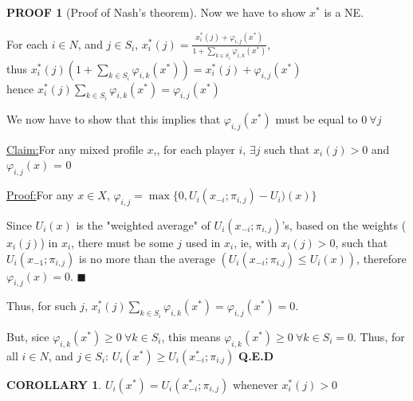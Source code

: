 \documentclass[12pt]{article}
\theoremstyle{definition}
\newtheorem*{Proof}{PROOF}
\newtheorem*{corollary}{COROLLARY}
\newenvironment{claim}[1]{\par\noindent\underline{Claim:}\space#1}{}
\newenvironment{claimproof}[1]{\par\noindent\underline{Proof:}\space#1}{\hfill $\blacksquare$}
\begin{document}
\begin{Proof}[Proof of Nash's theorem]
        Now we have to show $x^*$ is a NE.

        For each $i \in N$, and $j \in S_i$, $\displaystyle x_i^*(j) = \frac{x_i^*(j) + \varphi_{i,j}(x^*)}{1 + \sum_{k \in S_i} \varphi_{i,k}(x^*)}$,
        \\thus $x_i^*(j)\left(1 + \sum_{k \in S_i} \varphi_{i,k}(x^*)\right) = x_i^*(j) + \varphi_{i,j}(x^*)$
        \\hence $x_i^*(j)\sum_{k \in S_i} \varphi_{i,k}(x^*) = \varphi_{i,j}(x^*)$

        We now have to show that this implies that $\varphi_{i,j}(x^*)$ must be equal to  $0\ \forall j$

        \begin{claim}
            For any mixed profile $x$,, for each player $i$, $\exists j$ such that $x_i(j) > 0$ and $\varphi_{i,j}(x)$ = 0
        \end{claim}
        \begin{claimproof}
            For any $x \in X$, $\varphi_{i,j} = \max\{0, U_i(x_{-i};\pi_{i,j}) - U_i)(x)\}$

            Since $U_i(x)$ is the "weighted average" of $U_i(x_{-i};\pi_{i,j})$'s, based on the weights ($x_i(j)$) in $x_i$, there must be some $j$ used in $x_i$, ie, with $x_i(j) >  0$, such that $U_i(x_{-1}; \pi_{i,j})$ is no more than the average $\left(U_i(x_{-i};\pi_{i.j}) \leq U_i(x)\right)$, therefore $\varphi_{i,j}(x) = 0$.
        \end{claimproof}

        Thus, for such $j$, $x_i^*(j)\sum_{k \in S_i} \varphi_{i,k}(x^*) = \varphi_{i,j}(x^*) = 0$.

        But, sice $\varphi_{i,k}(x^*) \geq 0 \ \forall k \in S_i$, this means $\varphi_{i,k}(x^*) \geq 0 \ \forall k \in S_i = 0$. Thus, for all $i \in N$, and $j \in S_i$: $U_i(x^*) \geq U_i(x_{-i}^*;\pi_{i.j})$ \hfill\textbf{Q.E.D}
    \end{Proof}

    \begin{corollary}
        $U_i(x^*) = U_i(x_{-i}^*;\pi_{i,j})$ whenever $x_i^*(j) > 0$
    \end{corollary}
\end{document}
